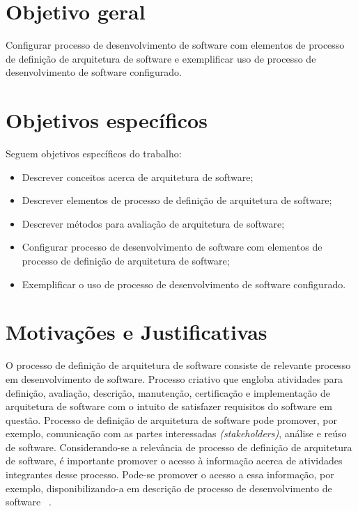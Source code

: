 \section{Objetivo geral}

Configurar processo de desenvolvimento de software com elementos de processo de definição de arquitetura de software e exemplificar uso de processo de desenvolvimento de software configurado.

\section{Objetivos específicos}

Seguem objetivos específicos do trabalho:

\begin{itemize}
    \item Descrever conceitos acerca de arquitetura de software;
    \item Descrever elementos de processo de definição de arquitetura de software;
    \item Descrever métodos para avaliação de arquitetura de software;
    \item Configurar processo de desenvolvimento de software com elementos de processo de definição de arquitetura de software;
    \item Exemplificar o uso de processo de desenvolvimento de software configurado.
\end{itemize}

\section{Motivações e Justificativas}

O processo de definição de arquitetura de software consiste de relevante processo em desenvolvimento de software. Processo criativo que engloba atividades para definição, avaliação, descrição, manutenção, certificação e implementação de arquitetura de software com o intuito de satisfazer requisitos do software em questão. Processo de definição de arquitetura de software pode promover, por exemplo, comunicação com as partes interessadas \emph{(stakeholders)}, análise e reúso de software. Considerando-se a relevância de processo de definição de arquitetura de software, é importante promover o acesso à informação acerca de atividades integrantes desse processo. Pode-se promover o acesso a essa informação, por exemplo, disponibilizando-a em descrição de processo de desenvolvimento de software  ~\cite{Sommerville_2011_texbook}.

